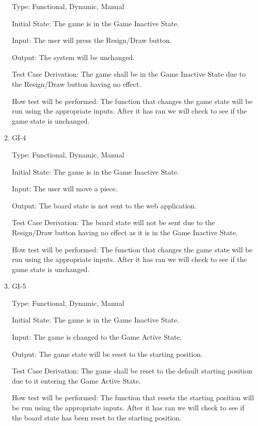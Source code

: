 \documentclass[12pt, titlepage]{article}
\begin{document}
\begin{enumerate}
    Type: Functional, Dynamic, Manual
                        
    Initial State: The game is in the Game Inactive State.
                        
    Input: The user will press the Resign/Draw button.
                        
    Output: The system will be unchanged.
                        
    Test Case Derivation: The game shall be in the Game Inactive State due to the Resign/Draw button having no effect.
    
    How test will be performed: The function that changes the game state will be run using the appropriate inputs.
    After it has ran we will check to see if the game state is unchanged.
  
    \item{GI-4\\}
  
    Type: Functional, Dynamic, Manual
                        
    Initial State: The game is in the Game Inactive State.
                        
    Input: The user will move a piece.
                        
    Output: The board state is not sent to the web application.
                        
    Test Case Derivation: The board state will not be sent due to the Resign/Draw button having no effect
    as it is in the Game Inactive State.
    
    How test will be performed: The function that changes the game state will be run using the appropriate inputs.
    After it has ran we will check to see if the game state is unchanged.
  
    \item{GI-5\\}
  
    Type: Functional, Dynamic, Manual
                      
    Initial State: The game is in the Game Inactive State.
                        
    Input: The game is changed to the Game Active State.
    
    Output: The game state will be reset to the starting position.
                        
    Test Case Derivation: The game shall be reset to the default starting position due to it entering the Game Active State.
    
    How test will be performed: The function that resets the starting position will be run using the appropriate inputs.
    After it has ran we will check to see if the board state has been reset to the starting position.
  
    \end{enumerate}
  
\end{document}
